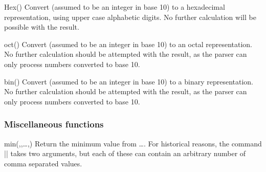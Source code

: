 \begin{math-function}{Hex()}
\mathcommand
    Convert  (assumed to be an integer in base 10) to a hexadecimal
    representation, using upper case alphabetic digits. No further calculation
    will be possible with the result.
\begin{codeexample}[]
 \pgfmathresult
\end{codeexample}
\end{math-function}

\begin{math-function}{oct()}
\mathcommand
    Convert  (assumed to be an integer in base 10) to an octal
    representation. No further calculation should be attempted with the result,
    as the parser can only process numbers converted to base 10.
\begin{codeexample}[]
 \pgfmathresult
\end{codeexample}
\end{math-function}

\begin{math-function}{bin()}
\mathcommand
    Convert  (assumed to be an integer in base 10) to a binary
    representation. No further calculation should be attempted with the result,
    as the parser can only process numbers converted to base 10.
\begin{codeexample}[]
 \pgfmathresult
\end{codeexample}
\end{math-function}


\subsubsection{Miscellaneous functions}
\label{pgfmath-functions-misc}

\begin{math-function}{min(,,\ldots,)}
    Return the minimum value from \ldots{}. For
    historical reasons, the command |\pgfmathmin| takes two arguments, but each
    of these can contain an arbitrary number of comma separated values.
\begin{codeexample}[]
 \pgfmathresult
\end{codeexample}
\end{math-function}

